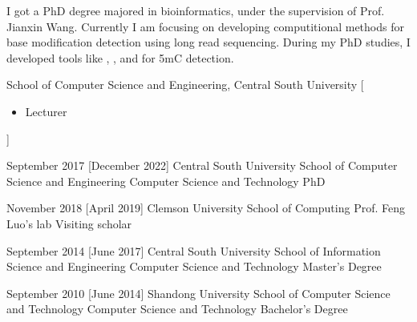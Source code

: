 \documentclass{resume}
\begin{document}
\makeheader

{\onehalfspacing\hspace{2em}%
I got a PhD degree majored in bioinformatics, under the supervision of Prof. Jianxin Wang. Currently I am focusing on developing computitional methods for base modification detection using long read sequencing. During my PhD studies, I developed tools like , , and  for 5mC detection.
\par}

\begin{competences}[10em]
\end{competences}

\begin{experiences}
    {School of Computer Science and Engineering, Central South University}%
    [\begin{itemize}
      \item Lecturer
    \end{itemize}]
\end{experiences}

\begin{educations}
  \education%
    {September 2017}%
    [December 2022]%
    {Central South University}%
    {School of Computer Science and Engineering}%
    {Computer Science and Technology}%
    {PhD}

  \separator{0.5ex}
  \education%
    {November 2018}%
    [April 2019]%
    {Clemson University}%
    {School of Computing}%
    {Prof. Feng Luo's lab}%
    {Visiting scholar}

  \separator{0.5ex}
  \education%
    {September 2014}%
    [June 2017]%
    {Central South University}%
    {School of Information Science and Engineering}%
    {Computer Science and Technology}%
    {Master's Degree}

  \separator{0.5ex}
  \education%
    {September 2010}%
    [June 2014]%
    {Shandong University}%
    {School of Computer Science and Technology}%
    {Computer Science and Technology}%
    {Bachelor's Degree}
\end{educations}
\end{document}
